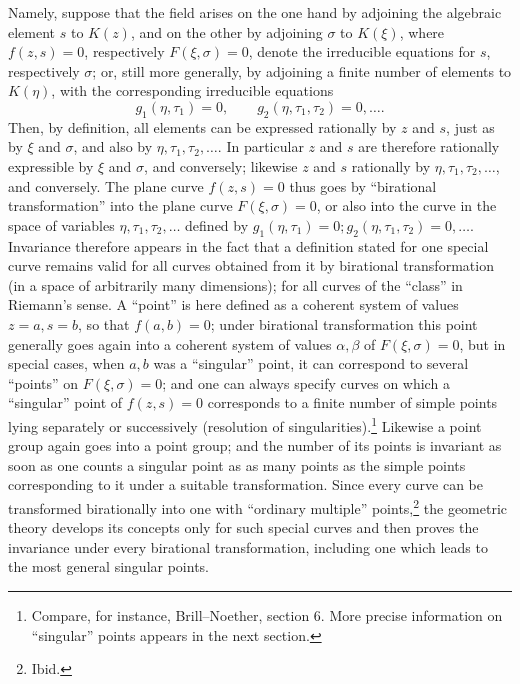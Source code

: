 \documentclass[11pt]{article}
\begin{document}
Namely, suppose that the field arises on the one hand by adjoining the algebraic element \(s\) to \(K(z)\), and on the other by adjoining \(\sigma\) to \(K(\xi)\), where \(f(z,s)=0\), respectively \(F(\xi,\sigma)=0\), denote the irreducible equations for \(s\), respectively \(\sigma\); or, still more generally, by adjoining a finite number of elements to \(K(\eta)\), with the corresponding irreducible equations
\[
g_1(\eta,\tau_1)=0,\qquad g_2(\eta,\tau_1,\tau_2)=0,\ldots .
\]
Then, by definition, all elements can be expressed rationally by \(z\) and \(s\), just as by \(\xi\) and \(\sigma\), and also by \(\eta,\tau_1,\tau_2,\ldots\). In particular \(z\) and \(s\) are therefore rationally expressible by \(\xi\) and \(\sigma\), and conversely; likewise \(z\) and \(s\) rationally by \(\eta,\tau_1,\tau_2,\ldots\), and conversely. The plane curve \(f(z,s)=0\) thus goes by ``birational transformation'' into the plane curve \(F(\xi,\sigma)=0\), or also into the curve in the space of variables \(\eta,\tau_1,\tau_2,\ldots\) defined by \(g_1(\eta,\tau_1)=0; g_2(\eta,\tau_1,\tau_2)=0,\ldots\). Invariance therefore appears in the fact that a definition stated for one special curve remains valid for all curves obtained from it by birational transformation (in a space of arbitrarily many dimensions); for all curves of the ``class'' in Riemann's sense. A ``point'' is here defined as a coherent system of values \(z=a,s=b\), so that \(f(a,b)=0\); under birational transformation this point generally goes again into a coherent system of values \(\alpha,\beta\) of \(F(\xi,\sigma)=0\), but in special cases, when \(a,b\) was a ``singular'' point, it can correspond to several ``points'' on \(F(\xi,\sigma)=0\); and one can always specify curves on which a ``singular'' point of \(f(z,s)=0\) corresponds to a finite number of simple points lying separately or successively (resolution of singularities).\footnote{Compare, for instance, Brill--Noether, section 6. More precise information on ``singular'' points appears in the next section.} Likewise a point group again goes into a point group; and the number of its points is invariant as soon as one counts a singular point as as many points as the simple points corresponding to it under a suitable transformation. Since every curve can be transformed birationally into one with ``ordinary multiple'' points,\footnote{Ibid.} the geometric theory develops its concepts only for such special curves and then proves the invariance under every birational transformation, including one which leads to the most general singular points.
\end{document}
